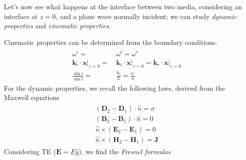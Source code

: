 \documentclass[a4paper, twocolumn]{article}
\begin{document}
Let's now see what happens at the interface between two media, considering an interface at $z=0$, and a plane wave normally incident; we can study \emph{dynamic properties} and \emph{cinematic properties}.

Cinematic properties can be determined from the boundary conditions.
\begin{gather}
  \label{eq:39}
  \begin{split}
    \omega^i=&~\omega^t=\omega^r\\
    \mathbf{k}_i\cdot\mathbf{x}\vert_{z=0}=&~\mathbf{k}_t\cdot\mathbf{x}\vert_{z=0}=\mathbf{k}_r\cdot\mathbf{x}\vert_{z=0} \\
    \frac{\sin i}{\sin t}=&~\frac{k_t}{k}=\frac{n'}{n} 
  \end{split}
\end{gather}
For the dynamic properties, we recall the following laws, derived from the Maxwell equations
\begin{gather}
  \label{eq:47}
  \begin{split}
    (\mathbf{D}_2-\mathbf{D}_1)\cdot\hat{n}=\sigma\\
    (\mathbf{B}_2-\mathbf{B}_1)\cdot\hat{n}=0\\
    \hat{n}\times(\mathbf{E}_2-\mathbf{E}_1)=0\\
    \hat{n}\times(\mathbf{H}_2-\mathbf{H}_1)=\mathbf{J}
  \end{split}  
\end{gather}
Considering TE ($\mathbf{E}=E\hat{y}$), we find the \emph{Fresnel formulas}
\end{document}
